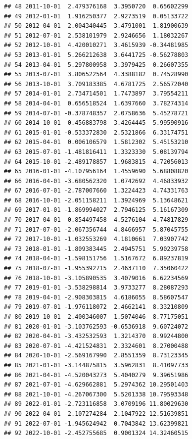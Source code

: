 \documentclass[
]{article}
\newenvironment{Shaded}{\begin{snugshade}}{\end{snugshade}}
\newcommand{\AttributeTok}[1]{\textcolor[rgb]{0.77,0.63,0.00}{#1}}
\newcommand{\FunctionTok}[1]{\textcolor[rgb]{0.00,0.00,0.00}{#1}}
\newcommand{\NormalTok}[1]{#1}
\newcommand{\SpecialCharTok}[1]{\textcolor[rgb]{0.00,0.00,0.00}{#1}}
\newcommand{\StringTok}[1]{\textcolor[rgb]{0.31,0.60,0.02}{#1}}
\begin{document}
\begin{verbatim}
## 48 2011-10-01  2.479376168  3.3950720  0.65602299
## 49 2012-01-01  1.916250377  2.9273519  0.05133722
## 50 2012-04-01  2.004340445  3.4791001  1.81900639
## 51 2012-07-01  2.538101979  2.9246656  1.18032267
## 52 2012-10-01  4.420010271  3.4615939 -0.34481985
## 53 2013-01-01  5.266212638  3.6441725 -0.56278803
## 54 2013-04-01  5.297800958  3.3979425  0.26607355
## 55 2013-07-01  3.806522564  4.3388182  0.74528990
## 56 2013-10-01  3.709183385  4.6781725  2.56572040
## 57 2014-01-01  2.734714501  1.7473897  3.79554211
## 58 2014-04-01  0.656518524  1.6397660  3.78274314
## 59 2014-07-01 -0.378748357  2.0758636  5.45278721
## 60 2014-10-01 -0.456883798  3.4264445  5.99590916
## 61 2015-01-01 -0.533372830  2.5321866  6.33174751
## 62 2015-04-01  0.006106579  1.5812302  5.45153210
## 63 2015-07-01 -1.481816411  1.3323330  5.08139794
## 64 2015-10-01 -2.489178857  1.9683815  4.72056013
## 65 2016-01-01 -4.107956164  1.4559690  5.68808820
## 66 2016-04-01 -3.680562320  1.0742692  4.46833932
## 67 2016-07-01 -2.787007660  1.3224423  4.74331763
## 68 2016-10-01 -2.051158211  1.3924969  5.13648621
## 69 2017-01-01 -1.869994027  2.7946125  5.16167309
## 70 2017-04-01 -0.854497458  4.5276104  4.74817829
## 71 2017-07-01 -2.067356744  4.8466957  5.87045755
## 72 2017-10-01 -1.032553269  4.1810661  7.03907742
## 73 2018-01-01 -1.809383445  2.4945751  5.90239758
## 74 2018-04-01 -1.598151756  1.5167672  6.89237819
## 75 2018-07-01 -1.955392715  2.4637110  7.35060422
## 76 2018-10-01 -3.105890535  3.4079016  6.62234569
## 77 2019-01-01 -3.538298814  3.9733277  8.28087293
## 78 2019-04-01 -2.908303815  4.6186055  8.58607547
## 79 2019-07-01 -1.976118072  2.4662141  8.33210809
## 80 2019-10-01 -2.400346007  1.5074046  8.77175051
## 81 2020-01-01 -3.103762593 -0.6536918  9.60724072
## 82 2020-04-01 -3.432532593  1.3214370  8.99244800
## 83 2020-07-01 -4.421524831  2.3324601  8.27000488
## 84 2020-10-01 -2.569167990  2.8551359  8.73123345
## 85 2021-01-01 -3.144875815  3.5962831  8.41097733
## 86 2021-04-01 -4.520043273  5.4040279  9.39651986
## 87 2021-07-01 -4.629662881  5.2974362 10.29501403
## 88 2021-10-01 -4.267067300  5.5201338 10.79593348
## 89 2022-01-01 -2.723116858  3.0709196 11.80029630
## 90 2022-04-01 -2.107274284  2.1047922 12.51639851
## 91 2022-07-01 -1.945624942  0.7043842 13.62399821
## 92 2022-10-01 -2.452755685  0.9001324 14.32460515
\end{verbatim}

\begin{Shaded}
\end{Shaded}
\end{document}
